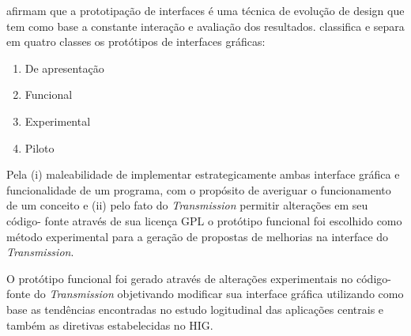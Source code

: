  afirmam que a prototipação de interfaces é uma técnica
de evolução de design que tem como base a constante interação e avaliação dos
resultados.  classifica e separa em quatro
classes os protótipos de interfaces gráficas:

\begin{enumerate}[label=(\alph*)]
  \item De apresentação
  \item Funcional
  \item Experimental
  \item Piloto
\end{enumerate}

Pela (i) maleabilidade de implementar estrategicamente ambas interface gráfica e
funcionalidade de um programa, com o propósito de averiguar o funcionamento de
um conceito e (ii) pelo fato do \textit{Transmission} permitir alterações em seu
código- fonte através de sua licença GPL o protótipo funcional foi escolhido
como método experimental para a geração de propostas de melhorias na interface
do \textit{Transmission}.

O protótipo funcional foi gerado através de alterações experimentais no código-
fonte do \textit{Transmission} objetivando modificar sua interface gráfica
utilizando como base as tendências encontradas no estudo logitudinal das
aplicações centrais e também as diretivas estabelecidas no HIG.
